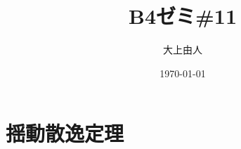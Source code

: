 \documentclass[a4paper,11pt]{jsarticle}
\begin{document}
\title{B4ゼミ\#11}
\author{大上由人}
\date{\today}
\maketitle
\section{揺動散逸定理}
\end{document}
